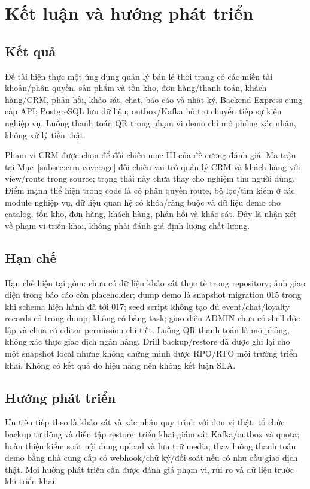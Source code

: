 \chapter{Kết luận và hướng phát triển}
\section{Kết quả}
Đề tài hiện thực một ứng dụng quản lý bán lẻ thời trang có các miền tài khoản/phân quyền, sản phẩm và tồn kho, đơn hàng/thanh toán, khách hàng/CRM, phản hồi, khảo sát, chat, báo cáo và nhật ký. Backend Express cung cấp API; PostgreSQL lưu dữ liệu; outbox/Kafka hỗ trợ chuyển tiếp sự kiện nghiệp vụ. Luồng thanh toán QR trong phạm vi demo chỉ mô phỏng xác nhận, không xử lý tiền thật.

Phạm vi CRM được chọn để đối chiếu mục III của đề cương đánh giá. Ma trận tại Mục~\ref{subsec:crm-coverage} đối chiếu vai trò quản lý CRM và khách hàng với view/route trong source; trạng thái này chưa thay cho nghiệm thu người dùng. Điểm mạnh thể hiện trong code là có phân quyền route, bộ lọc/tìm kiếm ở các module nghiệp vụ, dữ liệu quan hệ có khóa/ràng buộc và dữ liệu demo cho catalog, tồn kho, đơn hàng, khách hàng, phản hồi và khảo sát. Đây là nhận xét về phạm vi triển khai, không phải đánh giá định lượng chất lượng.

\section{Hạn chế}
Hạn chế hiện tại gồm: chưa có dữ liệu khảo sát thực tế trong repository; ảnh giao diện trong báo cáo còn placeholder; dump demo là snapshot migration 015 trong khi schema hiện hành đã tới 017; seed script không tạo đủ event/chat/loyalty records có trong dump; không có bảng task; giao diện ADMIN chưa có shell độc lập và chưa có editor permission chi tiết. Luồng QR thanh toán là mô phỏng, không xác thực giao dịch ngân hàng. Drill backup/restore đã được ghi lại cho một snapshot local nhưng không chứng minh được RPO/RTO môi trường triển khai. Không có kết quả đo hiệu năng nên không kết luận SLA.

\section{Hướng phát triển}
Ưu tiên tiếp theo là khảo sát và xác nhận quy trình với đơn vị thật; tổ chức backup tự động và diễn tập restore; triển khai giám sát Kafka/outbox và quota; hoàn thiện kiểm soát nội dung upload và lưu trữ media; thay luồng thanh toán demo bằng nhà cung cấp có webhook/chữ ký/đối soát nếu có nhu cầu giao dịch thật. Mọi hướng phát triển cần được đánh giá phạm vi, rủi ro và dữ liệu trước khi triển khai.

